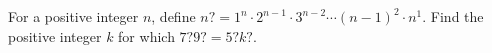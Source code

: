 For a positive integer $n$, define $n?=1^n\cdot2^{n-1}\cdot3^{n-2}\cdots\left(n-1\right)^2\cdot n^1$. Find the positive integer $k$ for which $7?9?=5?k?$.
